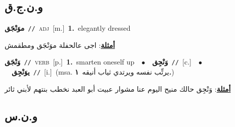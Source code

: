 \documentclass[10pt,a4paper,twoside]{article} %
\begin{document}
\begin{multicols}{2}
\vspace{-3mm}
\subsection*{\color{blue}\foreignlanguage{arabic}{و.ن.ج.ق}\color{blue}{}} 

{\setlength\topsep{0pt}\textbf{\foreignlanguage{arabic}{موَنْجَق}}\ {\color{gray}\texttt{//}\color{black}}\ \textsc{adj}\ [m.]\ \textbf{1.}~elegantly dressed\  \begin{flushright}\color{gray}\foreignlanguage{arabic}{\textbf{\underline{\foreignlanguage{arabic}{أمثلة}}}: اجى عالحفلة موَنْجَق ومطقمش}\end{flushright}\color{black}} \vspace{2mm}

{\setlength\topsep{0pt}\textbf{\foreignlanguage{arabic}{وَنْجَق}}\ {\color{gray}\texttt{//}\color{black}}\ \textsc{verb}\ [p.]\ \textbf{1.}~smarten oneself up\ \ $\bullet$\ \ \setlength\topsep{0pt}\textbf{\foreignlanguage{arabic}{وَنْجِق}}\ {\color{gray}\texttt{//}\color{black}}\ [c.]\ \ $\bullet$\ \ \setlength\topsep{0pt}\textbf{\foreignlanguage{arabic}{يوَنْجِق}}\ {\color{gray}\texttt{//}\color{black}}\ [i.]\ \color{gray}(msa. \foreignlanguage{arabic}{يرتِّب نفسه ويرتدي ثياب أنيقه}~\foreignlanguage{arabic}{\textbf{١.}})\color{black}\  \begin{flushright}\color{gray}\foreignlanguage{arabic}{\textbf{\underline{\foreignlanguage{arabic}{أمثلة}}}: وَنْجِق حالك منيح اليوم عنا مشوار عبيت أبو العبد نخطب بنتهم لأبني ثائر}\end{flushright}\color{black}} \vspace{2mm}

\vspace{-3mm}
\subsection*{\color{blue}\foreignlanguage{arabic}{و.ن.س}\color{blue}{}} 


\end{multicols}
\end{document}
